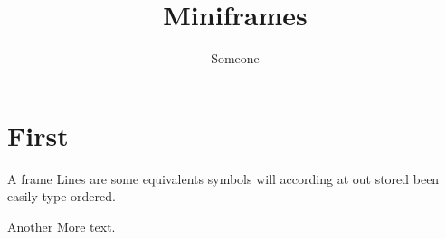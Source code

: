 \documentclass[aspectratio=54]{beamer}
\title{Miniframes}
\author{Someone}
\begin{document}
\section{First}
\begin{frame}{A frame}
Lines are some equivalents symbols will according at out stored been easily type ordered.
\end{frame}
\begin{frame}{Another}
More text.
\end{frame}
\end{document}
